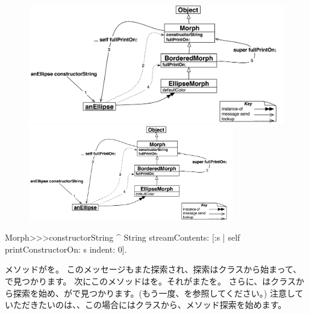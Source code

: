 \documentclass[a4paper,10pt,twoside]{book}
\begin{document}
\begin{figure}[htb]
\begin{center}
\ifluluelse
	{\includegraphics[width=\textwidth]{constructorStringLookup}}
	{\includegraphics[width=0.8\textwidth]{constructorStringLookup}}
\caption{}
\end{center}
\end{figure}

\begin{method}[constructorString]{}
Morph>>>constructorString
	^ String streamContents: [:s | self printConstructorOn: s indent: 0].
\end{method}
メソッドがを。
このメッセージもまた探索され、探索はクラスから始まって、で見つかります。
次にこのメソッドはを。それがまたを。
さらに、はクラスから探索を始め、がで見つかります。(もう一度、を参照してください。)
注意していただきたいのは、、この場合にはクラスから、メソッド探索を始めます。
\end{document}
